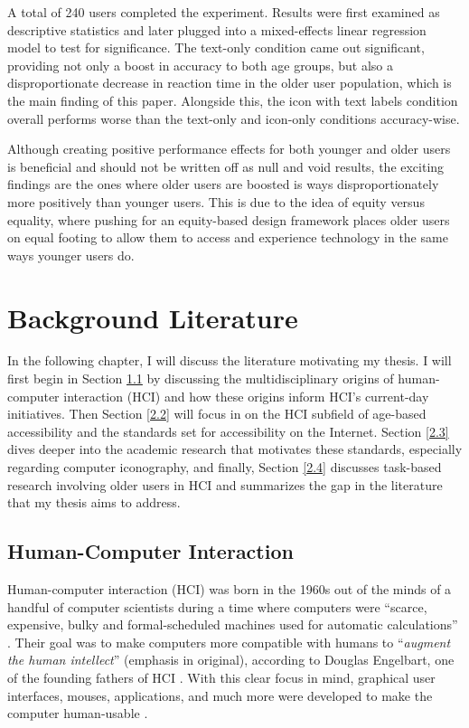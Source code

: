 \documentclass[12pt,twoside]{reedthesis}
\begin{document}
	A total of 240 users completed the experiment. Results were first examined as descriptive statistics and later plugged into a mixed-effects linear regression model to test for significance. The text-only condition came out significant, providing not only a boost in accuracy to both age groups, but also a disproportionate decrease in reaction time in the older user population, which is the main finding of this paper. Alongside this, the icon with text labels condition overall performs worse than the text-only and icon-only conditions accuracy-wise.

    Although creating positive performance effects for both younger and older users is beneficial and should not be written off as null and void results, the exciting findings are the ones where older users are boosted is ways disproportionately more positively than younger users. This is due to the idea of equity versus equality, where pushing for an equity-based design framework places older users on equal footing to allow them to access and experience technology in the same ways younger users do.
  

\chapter{Background Literature}\label{2}

In the following chapter, I will discuss the literature motivating my thesis. I will first begin in Section \ref{2.1} by discussing the multidisciplinary origins of human-computer interaction (HCI) and how these origins inform HCI's current-day initiatives. Then Section \ref{2.2} will focus in on the HCI subfield of age-based accessibility and the standards set for accessibility on the Internet. Section \ref{2.3} dives deeper into the academic research that motivates these standards, especially regarding computer iconography, and finally, Section \ref{2.4} discusses task-based research involving older users in HCI and summarizes the gap in the literature that my thesis aims to address.

\section{Human-Computer Interaction} \label{2.1}

    Human-computer interaction (HCI) was born in the 1960s out of the minds of a handful of computer scientists during a time where computers were \enquote{scarce, expensive, bulky and formal-scheduled machines used for automatic calculations} \cite{roussel_looking_nodate}. Their goal was to make computers more compatible with humans to \enquote{\textit{augment the human intellect}} (emphasis in original), according to Douglas Engelbart, one of the founding fathers of HCI \cite{roussel_looking_nodate}. With this clear focus in mind, graphical user interfaces, mouses, applications, and much more were developed to make the computer human-usable \cite{myers_brief_1998}.
\end{document}
